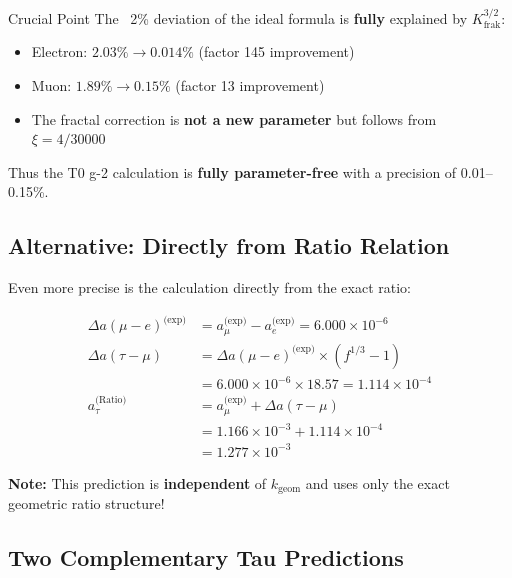 	\begin{important}{Crucial Point}
		The ~2\% deviation of the ideal formula is \textbf{fully} explained by $K_\text{frak}^{3/2}$:
		\begin{itemize}
			\item Electron: $2.03\% \to 0.014\%$ (factor 145 improvement)
			\item Muon: $1.89\% \to 0.15\%$ (factor 13 improvement)
			\item The fractal correction is \textbf{not a new parameter} but follows from $\xi = 4/30000$
		\end{itemize}
		
		Thus the T0 g-2 calculation is \textbf{fully parameter-free} with a precision of 0.01--0.15\%.
	\end{important}
	
	\subsection{Alternative: Directly from Ratio Relation}
	
	Even more precise is the calculation directly from the exact ratio:
	
	\begin{align}
		\Delta a(\mu-e)^{\text{(exp)}} &= a_\mu^{\text{(exp)}} - a_e^{\text{(exp)}} = 6.000 \times 10^{-6} \\
		\Delta a(\tau-\mu) &= \Delta a(\mu-e)^{\text{(exp)}} \times (f^{1/3} - 1) \\
		&= 6.000 \times 10^{-6} \times 18.57 = 1.114 \times 10^{-4} \\
		a_\tau^{\text{(Ratio)}} &= a_\mu^{\text{(exp)}} + \Delta a(\tau-\mu) \\
		&= 1.166 \times 10^{-3} + 1.114 \times 10^{-4} \\
		&= \boxed{1.277 \times 10^{-3}}
	\end{align}
	
	\textbf{Note:} This prediction is \textbf{independent} of $k_{\text{geom}}$ and uses only the exact geometric ratio structure!
	
	\subsection{Two Complementary Tau Predictions}
	
